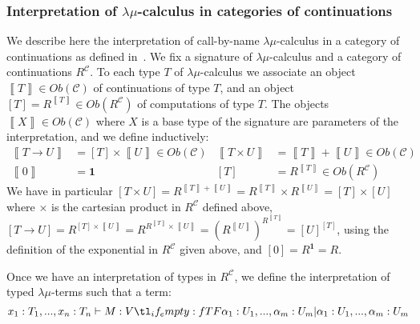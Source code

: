\documentclass{CSML}
\renewcommand{\ldots}{...}
\newcommand*\ifpresent[3]{\tl_if_empty:fTF{#1}{#3}{#2}}
\newcommand*\Entails{\mathrel{\vdash}}
\newcommand*\BarSep{\mathrel{|}}
\newcommand*\Sequent[3]{#1\Entails#2\ifpresent{#3}{\BarSep}{}#3}
\newcommand*\LmSortBot0
\newcommand*\LmSortBase{X}
\newcommand*\LmSortTimes\times
\newcommand*\LmSortA{T}
\newcommand*\LmSortB{U}
\newcommand*\LmSortC{V}
\newcommand*\LmTerm[2]{#1\mathrel{:}#2}
\newcommand*\LmTermA{M}
\newcommand*\LmVarA{x}
\newcommand*\LmMVarA\alpha
\newcommand*\CatC{\mathcal{C}}
\newcommand*\CatObj[1]{Ob\left(#1\right)}
\newcommand*\CatR{R}
\newcommand*\CatRC{\CatExp{\CatR}{\CatC}}
\newcommand*\CatTimes\times
\newcommand*\CatPlus{+}
\newcommand*\CatExp[2]{#1^{#2}}
\newcommand*\CatTerm{\mathbf{1}}
\newcommand*\CatInterpSortNeg[1]{{\left\llbracket#1\right\rrbracket}}
\newcommand*\CatInterpSort[1]{{\left[#1\right]}}
\begin{document}
\subsubsection{Interpretation of \texorpdfstring{$\lambda\mu$}{lambda-mu}-calculus in categories of continuations}
\label{CatInterp}
We describe here the interpretation of call-by-name $\lambda\mu$-calculus in a category of continuations as defined in~\cite{SelingerControl}. We fix a signature of $\lambda\mu$-calculus and a category of continuations $\CatRC$. To each type $\LmSortA$ of $\lambda\mu$-calculus we associate an object $\CatInterpSortNeg{\LmSortA}\in\CatObj{\CatC}$ of continuations of type $\LmSortA$, and an object $\CatInterpSort{\LmSortA}=\CatExp{\CatR}{\CatInterpSortNeg{\LmSortA}}\in\CatObj{\CatRC}$ of computations of type $\LmSortA$. The objects $\CatInterpSortNeg{\LmSortBase}\in\CatObj{\CatC}$ where $\LmSortBase$ is a base type of the signature are parameters of the interpretation, and we define inductively:
\begin{align*}
\CatInterpSortNeg{\LmSortA\to\LmSortB}&=\CatInterpSort{\LmSortA}\CatTimes\CatInterpSortNeg{\LmSortB}\in\CatObj{\CatC}&\CatInterpSortNeg{\LmSortA\LmSortTimes\LmSortB}&=\CatInterpSortNeg{\LmSortA}\CatPlus\CatInterpSortNeg{\LmSortB}\in\CatObj{\CatC}\\
\CatInterpSortNeg{\LmSortBot}&=\CatTerm&\CatInterpSort{\LmSortA}&=\CatExp{\CatR}{\CatInterpSortNeg{\LmSortA}}\in\CatObj{\CatRC}
\end{align*}
We have in particular $\CatInterpSort{\LmSortA\LmSortTimes\LmSortB}=\CatExp{\CatR}{\CatInterpSortNeg{\LmSortA}\CatPlus\CatInterpSortNeg{\LmSortB}}=\CatExp{\CatR}{\CatInterpSortNeg{\LmSortA}}\CatTimes\CatExp{\CatR}{\CatInterpSortNeg{\LmSortB}}=\CatInterpSort{\LmSortA}\CatTimes\CatInterpSort{\LmSortB}$ where $\CatTimes$ is the cartesian product in $\CatRC$ defined above, $\CatInterpSort{\LmSortA\to\LmSortB}=\CatExp{\CatR}{\CatInterpSort{\LmSortA}\CatTimes\CatInterpSortNeg{\LmSortB}}=\CatExp{\CatR}{\CatExp{\CatR}{\CatInterpSortNeg{\LmSortA}}\CatTimes\CatInterpSortNeg{\LmSortB}}=\CatExp{\left(\CatExp{\CatR}{\CatInterpSortNeg{\LmSortB}}\right)}{\CatExp{\CatR}{\CatInterpSortNeg{\LmSortA}}}=\CatExp{\CatInterpSort{\LmSortB}}{\CatInterpSort{\LmSortA}}$, using the definition of the exponential in $\CatRC$ given above, and $\CatInterpSort{\LmSortBot}=\CatExp{\CatR}{\CatTerm}=\CatR$.\par
Once we have an interpretation of types in $\CatRC$, we define the interpretation of typed $\lambda\mu$-terms such that a term:
$$\Sequent{\LmTerm{\LmVarA_1}{\LmSortA_1},\ldots,\LmTerm{\LmVarA_n}{\LmSortA_n}}{\LmTerm{\LmTermA}{\LmSortC}}{\LmTerm{\LmMVarA_1}{\LmSortB_1},\ldots,\LmTerm{\LmMVarA_m}{\LmSortB_m}}$$
\end{document}
